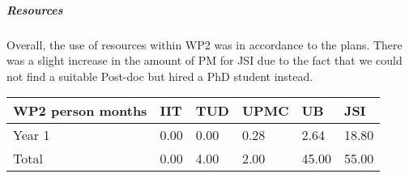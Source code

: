 \subparagraph{Resources}
Overall, the use of resources within WP2 was in accordance to the plans. There was a slight increase in the amount of PM for JSI due to the fact that we could not find a suitable Post-doc but hired a PhD student instead.

\begin{center}
\begin{tabular}{|C{1.5cm}|C{1.5cm}|C{1.5cm}|C{2cm}|C{2cm}|C{2cm}|}
\hline
\footnotesize \textbf{WP2 person months}& \footnotesize \textbf{IIT}&\footnotesize \textbf{TUD}&\footnotesize \textbf{UPMC}& \footnotesize \textbf{UB} &\footnotesize \textbf{JSI}\\ \hline
\footnotesize Year 1 &     0.00& 0.00 & 0.28 & 2.64 & 18.80   \\  \hline
\footnotesize Total &  0.00	 & 4.00 & 2.00 & 45.00 & 55.00 \\ \hline
\end{tabular}
\end{center}